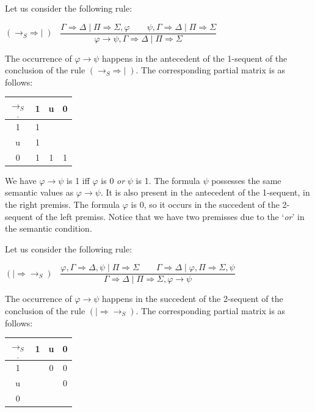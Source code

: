\documentclass[10pt,a4paper]{article}
\theoremstyle{definition}
\newcommand{\3}{\vspace{.3in}}
\newcommand{\2}{\vspace{.2in}}
\newcommand{\1}{\vspace{.1in}}
\newcommand{\5}{\vspace{.05in}}
\begin{document}
Let us consider the following rule:

\begin{flushleft}
	$(\mathord{\rightarrow_S}\mathord{\Rightarrow}\mid)$ \, $\dfrac{\Gamma
		\Rightarrow \Delta \mid \Pi\Rightarrow\Sigma, \varphi \qquad\psi, \Gamma\Rightarrow\Delta \mid
		\Pi \Rightarrow \Sigma } {\varphi\rightarrow\psi, \Gamma
		\Rightarrow \Delta \mid \Pi\Rightarrow\Sigma}$
\end{flushleft} 

The occurrence of $\varphi\rightarrow\psi$ happens in the antecedent of the 1-sequent of the conclusion of the rule $(\mathord{\rightarrow_S}\mathord{\Rightarrow}\mid)$.
The corresponding partial matrix is as follows:

\1

\begin{tabular}{|c|ccc|}
	\hline
	$\underline{\rightarrow_S} $ & 1 & u & 0 \\
	\hline
	1 & 1 &  &  \\
	u & 1 &  &  \\
	0 & 1 & 1 & 1 \\
	\hline
\end{tabular}

\1

We have $\varphi\rightarrow\psi$ is 1 iff $\varphi$ is 0 \textit{or} $\psi$ is 1.  The formula $ \psi $ possesses the same semantic values as $\varphi\rightarrow\psi$. It is also present in the antecedent of the 1-sequent, in the right premiss. The formula $ \varphi $ is 0, so it occurs in the succedent of the 2-sequent of the left premiss. Notice that we have two premisses due to the `\textit{or}' in the semantic condition.

Let us consider the following rule:

\begin{flushleft}
	$(\mathord{\mid\Rightarrow}\mathord{\rightarrow_S})$ \ $\dfrac{\varphi, \Gamma
		\Rightarrow \Delta, \psi \mid \Pi\Rightarrow\Sigma \qquad \Gamma\Rightarrow\Delta \mid \varphi, \Pi\Rightarrow\Sigma, \psi}{\Gamma\Rightarrow\Delta \mid \Pi\Rightarrow\Sigma, \varphi\rightarrow\psi}$
\end{flushleft}  

The occurrence of $\varphi\rightarrow\psi$ happens in the succedent of the 2-sequent of the conclusion of the rule $(\mathord{\mid\Rightarrow}\mathord{\rightarrow_S})$.
The corresponding partial matrix is as follows:

\1

\begin{tabular}{|c|ccc|}
	\hline
	$\underline{\rightarrow_S} $ & 1 & u & 0 \\
	\hline
	1 &  & 0 & 0 \\
	u &  &  & 0 \\
	0 &  &  &  \\
	\hline
\end{tabular} 
\end{document}
